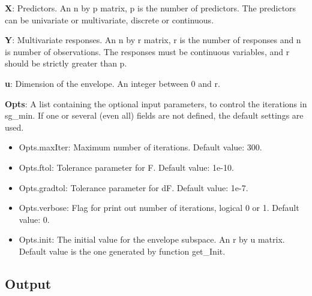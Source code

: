 \documentclass[a4paper,11pt,openany]{memoir}
\begin{document}
\begin{par}
\textbf{X}: Predictors. An n by p matrix, p is the number of predictors. The predictors can be univariate or multivariate, discrete or continuous.
\end{par} \vspace{1em}
\begin{par}
\textbf{Y}: Multivariate responses. An n by r matrix, r is the number of responses and n is number of observations. The responses must be continuous variables, and r should be strictly greater than p.
\end{par} \vspace{1em}
\begin{par}
\textbf{u}: Dimension of the envelope. An integer between 0 and r.
\end{par} \vspace{1em}
\begin{par}
\textbf{Opts}: A list containing the optional input parameters, to control the iterations in sg\_min. If one or several (even all) fields are not defined, the default settings are used.
\end{par} \vspace{1em}
\begin{itemize}
\setlength{\itemsep}{-1ex}
   \item Opts.maxIter: Maximum number of iterations.  Default value: 300.
   \item Opts.ftol: Tolerance parameter for F.  Default value: 1e-10.
   \item Opts.gradtol: Tolerance parameter for dF.  Default value: 1e-7.
   \item Opts.verbose: Flag for print out number of iterations, logical 0 or 1. Default value: 0.
      \item Opts.init: The initial value for the envelope subspace. An r by u matrix. Default value is the one generated by function get\_Init.
\end{itemize}


\subsection*{Output}
\end{document}
